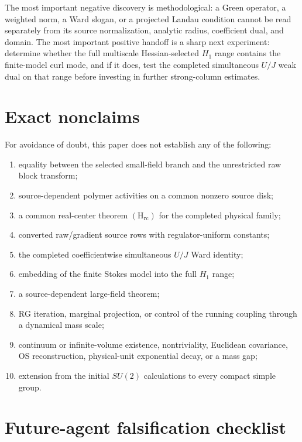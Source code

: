 \documentclass[11pt]{article}
\theoremstyle{definition}
\newcommand{\RG}{\mathrm{RG}}
\newcommand{\Hrc}{(\mathrm H_{\mathrm{rc}})}
\begin{document}
The most important negative discovery is methodological: a Green operator,
a weighted norm, a Ward slogan, or a projected Landau condition cannot be
read separately from its source normalization, analytic radius, coefficient
dual, and domain.  The most important positive handoff is a sharp next
experiment: determine whether the full multiscale Hessian-selected
\(H_1\) range contains the finite-model curl mode, and if it does, test the
completed simultaneous \(U/J\) weak dual on that range before investing in
further strong-column estimates.

\appendix

\section{Exact nonclaims}

For avoidance of doubt, this paper does not establish any of the following:
\begin{enumerate}
  \item equality between the selected small-field branch and the
  unrestricted raw block transform;
  \item source-dependent polymer activities on a common nonzero source disk;
  \item a common real-center theorem \(\Hrc\) for the completed physical
  family;
  \item converted raw/gradient source rows with regulator-uniform constants;
  \item the completed coefficientwise simultaneous \(U/J\) Ward identity;
  \item embedding of the finite Stokes model into the full \(H_1\) range;
  \item a source-dependent large-field theorem;
  \item \(\RG\) iteration, marginal projection, or control of the running
  coupling through a dynamical mass scale;
  \item continuum or infinite-volume existence, nontriviality, Euclidean
  covariance, OS reconstruction, physical-unit exponential decay, or a
  mass gap;
  \item extension from the initial \(SU(2)\) calculations to every compact
  simple group.
\end{enumerate}

\section{Future-agent falsification checklist}
\end{document}

